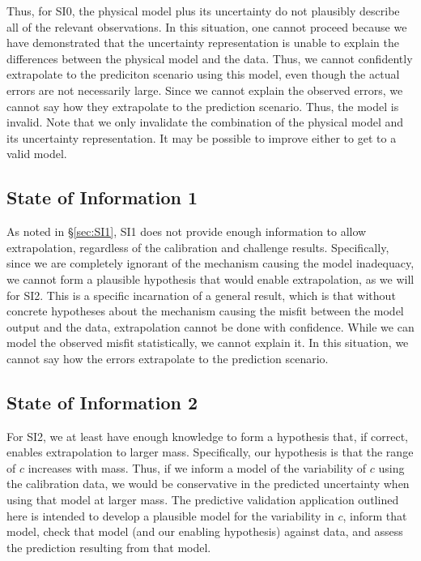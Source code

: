 \documentclass[11pt]{article}
\begin{document}
Thus, for SI0, the physical model plus its uncertainty do not
plausibly describe all of the relevant observations.  In this
situation, one cannot proceed because we have demonstrated that the
uncertainty representation is unable to explain the differences
between the physical model and the data.  Thus, we cannot confidently
extrapolate to the prediciton scenario using this model, even though
the actual errors are not necessarily large.  Since we cannot explain
the observed errors, we cannot say how they extrapolate to the
prediction scenario.  Thus, the model is invalid.  Note that we only
invalidate the combination of the physical model and its uncertainty
representation.  It may be possible to improve either to get to a
valid model.

\subsection{State of Information 1}
As noted in \S\ref{sec:SI1}, SI1 does not provide enough information
to allow extrapolation, regardless of the calibration and challenge
results.  Specifically, since we are completely ignorant of the
mechanism causing the model inadequacy, we cannot form a plausible
hypothesis that would enable extrapolation, as we will for SI2.  This
is a specific incarnation of a general result, which is that without
concrete hypotheses about the mechanism causing the misfit between the
model output and the data, extrapolation cannot be done with
confidence.  While we can model the observed misfit statistically, we
cannot explain it.  In this situation, we cannot say how the errors
extrapolate to the prediction scenario.

\subsection{State of Information 2}
For SI2, we at least have enough knowledge to form a hypothesis that,
if correct, enables extrapolation to larger mass.  Specifically, our
hypothesis is that the range of $c$ increases with mass.  Thus, if we
inform a model of the variability of $c$ using the calibration data,
we would be conservative in the predicted uncertainty when using that
model at larger mass.  The predictive validation application outlined
here is intended to develop a plausible model for the variability in
$c$, inform that model, check that model (and our enabling hypothesis)
against data, and assess the prediction resulting from that model.
\end{document}
